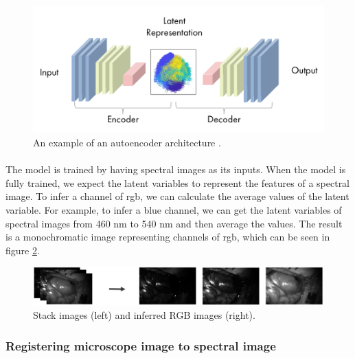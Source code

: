 \documentclass[12pt,oneside]{report}
\begin{document}
\begin{figure}[h]
\centering
\begin{minipage}[h]{0.8\textwidth}
    \centering
    \includegraphics[width=\textwidth]{figures/autoencoder.png}
    \caption{An example of an autoencoder architecture \cite{mathworks_autoencoders_nodate}.}
    \label{fig:autoencoder}
\end{minipage}
\end{figure}

\paragraph{}
The model is trained by having spectral images as its inputs. When the model is fully trained, we expect the latent variables to represent the features of a spectral image. To infer a channel of \acrshort{rgb}, we can calculate the average values of the latent variable. For example, to infer a blue channel, we can get the latent variables of spectral images from 460 nm to 540 nm and then average the values. The result is a monochromatic image representing channels of \acrshort{rgb}, which can be seen in figure \ref{fig:inferred-rgb}.

\vspace{0.2cm}
\begin{figure}[h]
\centering
\begin{minipage}[h]{\textwidth}
    \centering
    \includegraphics[width=\textwidth]{figures/inferred-rgb.png}
    \caption{Stack images (left) and inferred RGB images (right).}
    \label{fig:inferred-rgb}
\end{minipage}
\end{figure}

\subsubsection{Registering microscope image to spectral image}
\end{document}
